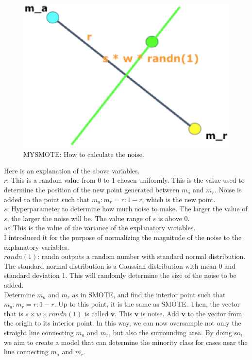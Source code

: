 \begin{center}
    \begin{figure}[ht]
        \caption{MYSMOTE: How to calculate the noise.}
        \label{tab:team-rating-features}
        \begin{center}
            \includegraphics[scale=0.6]{image/mysmote1.eps}
        \end{center}
    \end{figure}
\end{center}

Here is an explanation of the above variables.\\ 
$r$: This is a random value from $0$ to $1$ chosen uniformly.
This is the value used to determine the position of the new point generated between $m_a$ and $m_r$.
Noise is added to the point such that $m_a:m_r=r:1-r$, which is the new point.\\
$s$: Hyperparameter to determine how much noise to make.
The larger the value of $s$, the larger the noise will be.
The value range of $s$ is above 0.\\
$w$: This is the value of the variance of the explanatory variables.\\
I introduced it for the purpose of normalizing the magnitude of the noise to the explanatory variables.\\
$randn(1)$: randn outputs a random number with standard normal distribution.
The standard normal distribution is a Gaussian distribution with mean 0 and standard deviation 1.
This will randomly determine the size of the noise to be added.\\


Determine $m_a$ and $m_r$ as in SMOTE, and find the interior point such that $m_a:m_r=r:1-r$.
Up to this point, it is the same as SMOTE.
Then, the vector that is $s \times w \times randn(1)$ is called $\bm{v}$.
This $\bm{v}$ is noise.
Add $\bm{v}$ to the vector from the origin to its interior point.
In this way, we can now oversample not only the straight line connecting $m_a$ and $m_r$, but also the surrounding area.
By doing so, we aim to create a model that can determine the minority class for cases near the line connecting $m_a$ and $m_r$.


